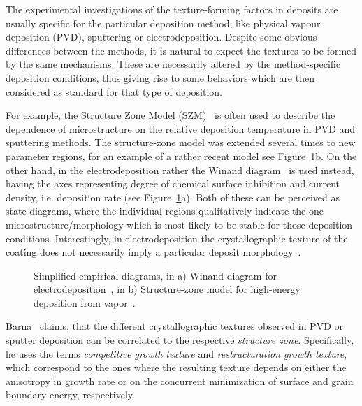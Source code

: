The experimental investigations of the texture-forming factors in deposits are usually specific for the particular deposition method, like physical vapour deposition (PVD), sputtering or electrodeposition. Despite some obvious differences between the methods, it is natural to expect the textures to be formed by the same mechanisms. These are necessarily altered by the method-specific deposition conditions, thus giving rise to some behaviors which are then considered as standard for that type of deposition. 

For example, the Structure Zone Model (SZM)~\cite{Barna1998, Anders2010} is often used to describe the dependence of microstructure on the relative deposition temperature in PVD and sputtering methods. The structure-zone model was extended several times to new parameter regions, for an example of a rather recent model see Figure~\ref{fig_SZM_and_Winand}b. On the other hand, in the electrodeposition rather the Winand diagram~\cite{Winand1992} is used instead, having the axes representing degree of chemical surface inhibition and current density, i.e. deposition rate (see Figure~\ref{fig_SZM_and_Winand}a). Both of these can be perceived as state diagrams, where the individual regions qualitatively indicate the one microstructure/morphology which is most likely to be stable for those deposition conditions. Interestingly, in electrodeposition the crystallographic texture of the coating does not necessarily imply a particular deposit morphology~\cite{Winand1992}.

\begin{figure}
	\centering
	\caption[Examples of Structure Zone Model and Winand diagram]{Simplified empirical diagrams, in a) Winand diagram for electrodeposition~\cite{Winand1992}, in b) Structure-zone model for high-energy deposition from vapor~\cite{Anders2010}.}
	\label{fig_SZM_and_Winand}
\end{figure}

Barna~\cite{Barna1998} claims, that the different crystallographic textures observed in PVD or sputter deposition can be correlated to the respective \textit{structure zone}. Specifically, he uses the terms \textit{competitive growth texture} and \textit{restructuration growth texture}, which correspond to the ones where the resulting texture depends on either the anisotropy in growth rate or on the concurrent minimization of surface and grain boundary energy, respectively.

